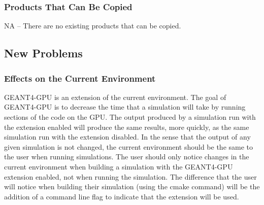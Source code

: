 \documentclass[12pt]{article}
\newcommand{\todo}[1]{\textcolor{red}{[TODO: #1]}} \else
\newcommand{\authornote}[3]{} \newcommand{\todo}[1]{} \fi
\newcommand{\ds}[1]{\authornote{blue}{DS}{#1}} %
\newcommand{\vr}[1]{\authornote{green}{VR}{#1}}
\begin{document}
\subsubsection{Products That Can Be Copied}
NA -- There are no existing products that can be copied.

\subsection{New Problems}\label{SubSec_NewProbs} %
\subsubsection{Effects on the Current Environment}
GEANT4-GPU is an extension of the current environment. The goal of GEANT4-GPU is to decrease the time that a simulation will take by running sections of the code on the GPU. The output produced by a simulation run with the extension enabled will produce the same results, more quickly, as the same simulation run with the extension disabled. In the sense that the output of any given simulation is not changed, the current environment should be the same to the user when running simulations. The user should only notice changes in the current environment when building a simulation with the GEANT4-GPU extension enabled, not when running the  simulation. The difference that the user will notice when building their simulation (using the cmake command) will be the addition of a command line flag to indicate that the extension will be used.
\ds{You are describing design decisions, not effects on the current environment}\vr{Changed section to describe how design decisions effect the current environment}
\end{document}
